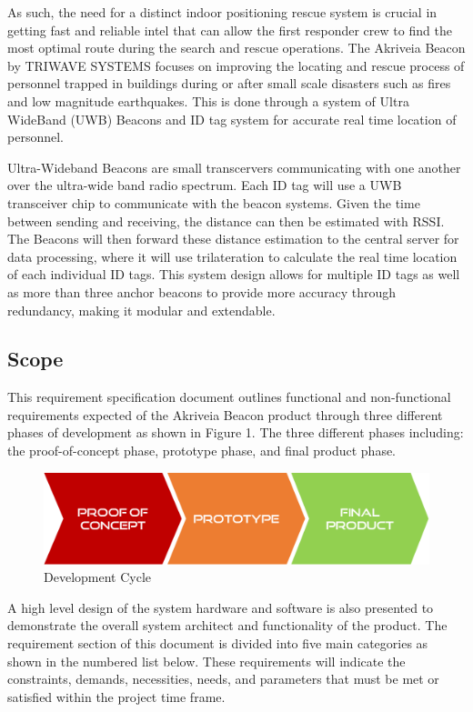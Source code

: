 \bigskip
As such, the need for a distinct indoor positioning rescue system is crucial in getting fast and reliable intel that can allow the first responder crew to find the most optimal route during the search and rescue operations. The Akriveia Beacon by TRIWAVE SYSTEMS focuses on improving the locating and rescue process of personnel trapped in buildings during or after small scale disasters such as fires and low magnitude earthquakes. This is done through a system of Ultra WideBand (UWB) Beacons and ID tag system for accurate real time location of personnel.

\bigskip
Ultra-Wideband Beacons are small transcervers communicating with one another over the ultra-wide band radio spectrum. Each ID tag will use a UWB transceiver chip to communicate with the beacon systems. Given the time between sending and receiving, the distance can then be estimated with RSSI. The Beacons will then forward these distance estimation to the central server for data processing, where it will use trilateration to calculate the real time location of each individual ID tags. This system design allows for multiple ID tags as well as more than three anchor beacons to provide more accuracy through redundancy, making it modular and extendable.

\break

\subsection{Scope}
This requirement specification document outlines functional and non-functional requirements expected of the Akriveia Beacon product through three different phases of development as shown in Figure 1. The three different phases including: the proof-of-concept phase, prototype phase, and final product phase.
\medskip

\begin{figure}[H]
\centering
    \includegraphics[scale=0.4]{./images/dev-path.png}
    \caption{Development Cycle}
\end{figure}

A high level design of the system hardware and software is also presented to demonstrate the overall system architect and functionality of the product. The requirement section of this document is divided into five main categories as shown in the numbered list below. These requirements will indicate the constraints, demands, necessities, needs, and parameters that must be met or satisfied within the project time frame.

